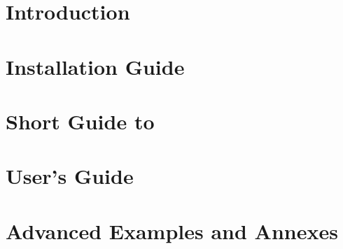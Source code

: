 \documentclass[a4paper,11pt]{book}
\begin{document}
\frontmatter

\tableofcontents
\mainmatter
%
\part{Introduction}

%
\part{Installation Guide}

%
\part{Short Guide to \molcas}

%
\part{User's Guide}

%
\part{Advanced Examples and Annexes}

%
%
\backmatter
\nocite{*}


\listoffigures
\listoftables
\printindex
\end{document}
